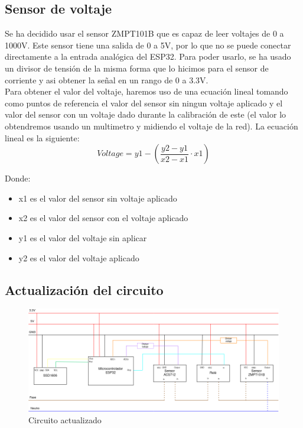 \begin{titlepage}
\subsection{Sensor de voltaje}
Se ha decidido usar el sensor ZMPT101B que es capaz de leer voltajes de 0 a 1000V. Este sensor tiene una salida de 0 a 5V, por lo que no se puede conectar directamente a la entrada analógica del ESP32. Para poder usarlo, se ha usado un divisor de tensión de la misma forma que lo hicimos para el sensor de corriente y asi obtener la señal en un rango de 0 a 3.3V.\\

Para obtener el valor del voltaje, haremos uso de una ecuación lineal tomando como puntos de referencia el valor del sensor sin ningun voltaje aplicado y el valor del sensor con un voltaje dado durante la calibración de este (el valor lo obtendremos usando un multimetro y midiendo el voltaje de la red). La ecuación lineal es la siguiente: \\

\begin{equation}
	Voltage = y1 - (\frac{y2 - y1}{x2 - x1} \cdot x1)
\end{equation}

Donde: \\
\begin{itemize}
	\item x1 es el valor del sensor sin voltaje aplicado
	\item x2 es el valor del sensor con el voltaje aplicado
	\item y1 es el valor del voltaje sin aplicar
	\item y2 es el valor del voltaje aplicado
\end{itemize}
\subsection{Actualización del circuito}
\begin{figure}[h]
	\centering
	\includegraphics[width=1\textwidth]{imagenes/setup_experimental2.png}
	\caption{Circuito actualizado}
	\label{fig:circuit}
\end{figure}

\end{titlepage}
